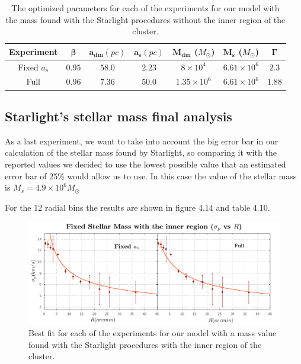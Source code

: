 \begin{table}[H]
\begin{center}
\begin{tabular}{| c| c| c| c| c| c| c|}
    \hline
    \textbf{Experiment} & $\mathbf{\beta}$ & $\mathbf{a_{dm}} (pc)$ & $\mathbf{a_{s}} (pc)$ & $\mathbf{M_{dm}}$ ($M_{\odot}$) & $\mathbf{M_{s}}$ ($M_{\odot}$) & $\mathbf{\Gamma}$\\ \hline
	Fixed $a_s$ &	$0.95$ &	$58.0$ &	$2.23$ &	$8 \times 10^{4}$ &	$6.61 \times 10 ^{6}$ &	$2.3$\\ \hline
	Full &	$0.96$ &	$7.36$ &	$50.0$ &	$1.35 \times 10^{6}$ &	$6.61 \times 10^{6}$ &	$1.88$\\ \hline
  \end{tabular} 
\caption[Optimized parameters for our model with the mass found with the Starlight procedures without the inner region.]{The optimized parameters for each of the experiments for our model with the mass found with the Starlight procedures without the inner region of the cluster.}
\end{center}
\end{table}

\subsection{Starlight's stellar mass final analysis}

As a last experiment, we want to take into account the big error bar in our calculation of the stellar mass found by Starlight, so comparing it with the reported values we decided to use the lowest possible value that an estimated error bar of 25\% would allow us to use. In this case the value of the stellar mass is $M_{s}=4.9 \times 10^{6} M_{\odot}$

For the 12 radial bins the results are shown in figure 4.14 and table 4.10.

\begin{figure}[H]
\centering
\includegraphics[width=15cm]{images/Starlight_25_12.png}
\caption[Best fits for our model with a mass value based on the Starlight procedures with the inner region.]{Best fit for each of the experiments for our model with a mass value found with the Starlight procedures with the inner region of the cluster.}
\end{figure}

